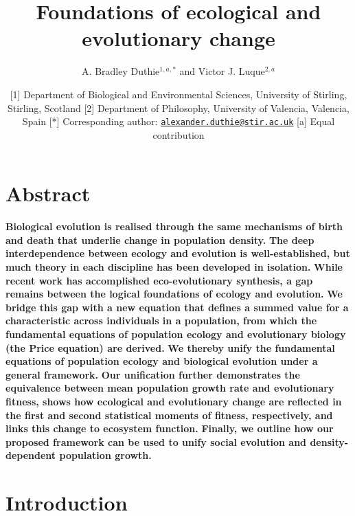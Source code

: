 \documentclass[
]{article}
\title{Foundations of ecological and evolutionary change}
\author{A. Bradley Duthie\(^{1,a,*}\) and Victor J. Luque\(^{2,a}\)}
\date{{[}1{]} Department of Biological and Environmental Sciences,
University of Stirling, Stirling, Scotland {[}2{]} Department of
Philosophy, University of Valencia, Valencia, Spain {[}*{]}
Corresponding author:
\href{mailto:alexander.duthie@stir.ac.uk}{\nolinkurl{alexander.duthie@stir.ac.uk}}
{[}a{]} Equal contribution}
\begin{document}
\maketitle

\hypertarget{abstract}{%
\section{Abstract}\label{abstract}}

\textbf{Biological evolution is realised through the same mechanisms of
birth and death that underlie change in population density.} \textbf{The
deep interdependence between ecology and evolution is well-established,
but much theory in each discipline has been developed in isolation.}
\textbf{While recent work has accomplished eco-evolutionary synthesis, a
gap remains between the logical foundations of ecology and evolution.}
\textbf{We bridge this gap with a new equation that defines a summed
value for a characteristic across individuals in a population, from
which the fundamental equations of population ecology and evolutionary
biology (the Price equation) are derived.} \textbf{We thereby unify the
fundamental equations of population ecology and biological evolution
under a general framework.} \textbf{Our unification further demonstrates
the equivalence between mean population growth rate and evolutionary
fitness, shows how ecological and evolutionary change are reflected in
the first and second statistical moments of fitness, respectively, and
links this change to ecosystem function.} \textbf{Finally, we outline
how our proposed framework can be used to unify social evolution and
density-dependent population growth.}

\hypertarget{introduction}{%
\section{Introduction}\label{introduction}}
\end{document}
